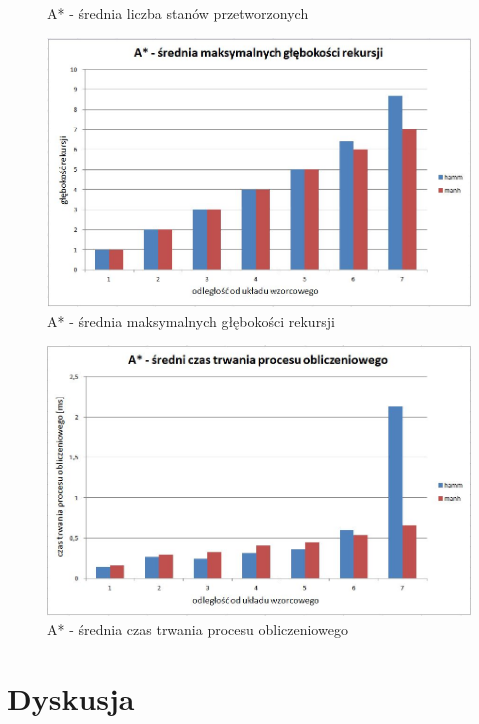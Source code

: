 \documentclass{classrep}
\begin{document}
{\begin{figure}[ht!]
\begin{center}
		\caption{A* - średnia liczba stanów przetworzonych}
		\vspace{0.5in}
		\includegraphics[scale=0.6]{astr4}
		\caption{A* - średnia maksymalnych głębokości rekursji}
	\end{center}
\end{figure}
\newpage
\begin{figure}[ht!]
	\begin{center}
		\vspace{0.3in}
		\includegraphics[scale=0.6]{astr5}
		\caption{A* - średnia czas trwania procesu obliczeniowego}
	\end{center}
\end{figure}

}

\section{Dyskusja}
\end{document}
